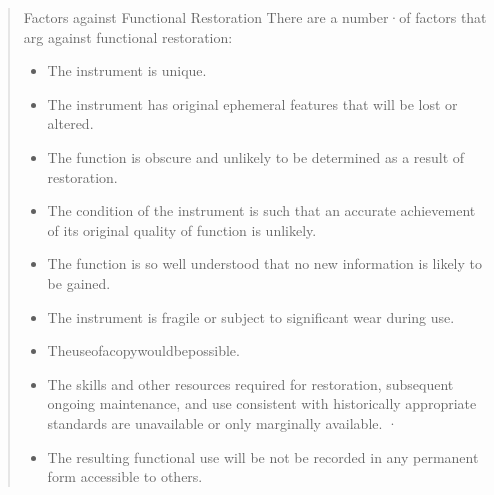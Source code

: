 \begin{quotation}
Factors against Functional Restoration There are a number·of factors that arg\ue
against functional restoration:
    \begin{itemize}
        \item The instrument is unique.
        \item The instrument has original ephemeral features that will be lost
        or altered.
        \item The function is obscure and unlikely to be determined as a result
        of restoration.
        \item The condition of the instrument is such that an accurate
        achievement of its original quality of function is unlikely.
        \item The function is so well understood that no new information is
        likely to be gained.
        \item The instrument is fragile or subject to significant wear during
        use.
        \item Theuseofacopywouldbepossible.
        \item The skills and other resources required for restoration,
        subsequent ongoing maintenance, and use consistent with historically
        appropriate standards are unavailable or only marginally available. ·
        \item The resulting functional use will be not be recorded in any
        permanent form accessible to others.
    \end{itemize}


\end{quotation}
